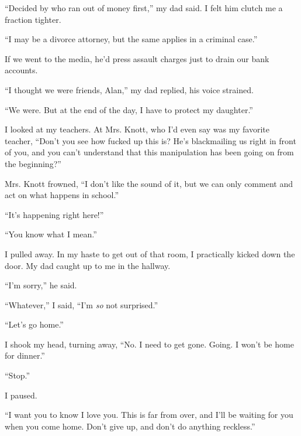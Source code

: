 ``Decided by who ran out of money first,'' my dad said.  I felt him clutch me a fraction tighter.



``I may be a divorce attorney, but the same applies in a criminal case.''



If we went to the media, he'd press assault charges just to drain our bank accounts.



``I thought we were friends, Alan,'' my dad replied, his voice strained.



``We were.  But at the end of the day, I have to protect my daughter.''



I looked at my teachers.  At Mrs. Knott, who I'd even say was my favorite teacher, ``Don't you see how fucked up this is?  He's blackmailing us right in front of you, and you can't understand that this manipulation has been going on from the beginning?''



Mrs. Knott frowned, ``I don't like the sound of it, but we can only comment and act on what happens in school.''



``It's happening right here!''



``You know what I mean.''



I pulled away.  In my haste to get out of that room, I practically kicked down the door.  My dad caught up to me in the hallway.



``I'm sorry,'' he said.



``Whatever,'' I said, ``I'm \emph{so} not surprised.''



``Let's go home.''



I shook my head, turning away, ``No.  I need to get gone.  Going.  I won't be home for dinner.''



``Stop.''



I paused.



``I want you to know I love you.  This is far from over, and I'll be waiting for you when you come home.  Don't give up, and don't do anything reckless.''



